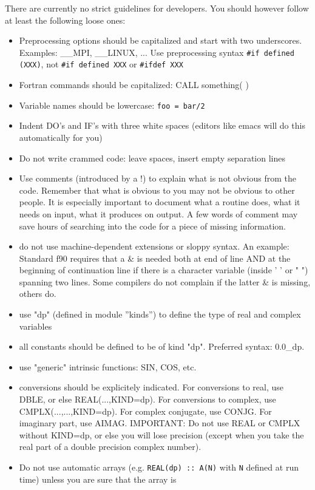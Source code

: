 \documentclass[12pt,a4paper]{article}
\begin{document}
There are currently no strict guidelines for developers. You
should however follow at least the following loose ones:
\begin{itemize}
\item Preprocessing options should be capitalized and start with
two underscores. Examples: \_\_MPI, \_\_LINUX, ... Use 
preprocessing syntax \verb|#if defined (XXX)|, not \verb|#if defined XXX|
or \verb|#ifdef XXX|
\item Fortran commands should be capitalized:
CALL something( )
\item Variable names should be lowercase: \texttt{foo = bar/2}
\item Indent DO's and IF's with three white spaces (editors like emacs will do this automatically for you)
\item Do not write crammed code: leave spaces, insert empty separation lines
\item Use comments (introduced by a !) to explain what is not obvious from
the code. Remember that what is obvious to you may not be obvious to other
people. It is especially important to document what a routine does, what
it needs on input, what it produces on output. A few words of comment
may save hours of searching into the code for a piece of missing information.
\item do not use machine-dependent extensions or sloppy syntax. An example:
Standard f90
requires that a \& is needed both at end of line AND at the beginning of
continuation line if there is a character variable (inside ' ' or " ")
spanning two lines. Some compilers do not complain if the latter \& is
missing, others do.
\item use "dp" (defined in module ''kinds'') to define the type of real and complex variables
\item all constants should be defined to be of kind "dp".  Preferred syntax: 0.0\_dp.
\item use "generic" intrinsic functions: SIN, COS, etc.
\item conversions should be explicitely indicated. For conversions to real,
use DBLE, or else REAL(...,KIND=dp). For conversions to complex, use
CMPLX(...,...,KIND=dp). For complex conjugate, use CONJG.  For imaginary part,
use AIMAG.  IMPORTANT: Do not use REAL or CMPLX without KIND=dp, or else you
will lose precision (except when you take the real part of a
double precision complex number).
\item Do not use automatic arrays (e.g. \texttt{REAL(dp) :: A(N)} with
\texttt{N} defined at run time) unless you are sure that the array is

\end{itemize}
\end{document}
